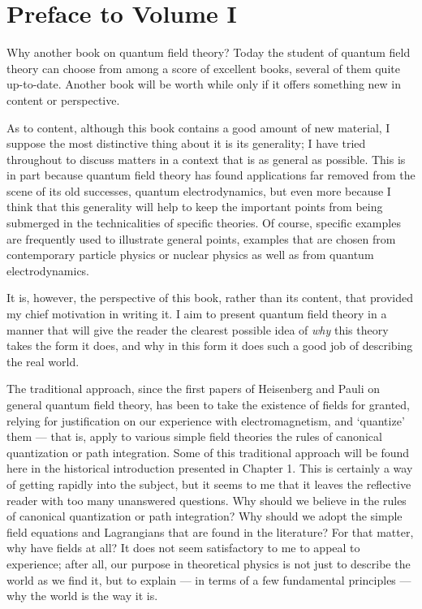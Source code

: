 \section*{Preface to Volume I}

Why another book on quantum field theory? Today the student of quantum field
theory can choose from among a score of excellent books, several of them quite
up-to-date. Another book will be worth while only if it offers something new in
content or perspective.

As to content, although this book contains a good amount of new material, I
suppose the most distinctive thing about it is its generality; I have tried
throughout to discuss matters in a context that is as general as possible. This
is in part because quantum field theory has found applications far removed from
the scene of its old successes, quantum electrodynamics, but even more because I
think that this generality will help to keep the important points from being
submerged in the technicalities of specific theories. Of course, specific
examples are frequently used to illustrate general points, examples that are
chosen from contemporary particle physics or nuclear physics as well as from
quantum electrodynamics.

It is, however, the perspective of this book, rather than its content, that
provided my chief motivation in writing it. I aim to present quantum field
theory in a manner that will give the reader the clearest possible idea of
\emph{why} this theory takes the form it does, and why in this form it does such
a good job of describing the real world.

The traditional approach, since the first papers of Heisenberg and Pauli on
general quantum field theory, has been to take the existence of fields for
granted, relying for justification on our experience with electromagnetism, and
`quantize' them --- that is, apply to various simple field theories the rules of
canonical quantization or path integration. Some of this traditional approach
will be found here in the historical introduction presented in Chapter 1. This
is certainly a way of getting rapidly into the subject, but it seems to me that
it leaves the reflective reader with too many unanswered questions. Why should
we believe in the rules of canonical quantization or path integration? Why
should we adopt the simple field equations and Lagrangians that are found in the
literature? For that matter, why have fields at all? It does not seem
satisfactory to me to appeal to experience; after all, our purpose in
theoretical physics is not just to describe the world as we find it, but to
explain --- in terms of a few fundamental principles --- why the world is the
way it is.

